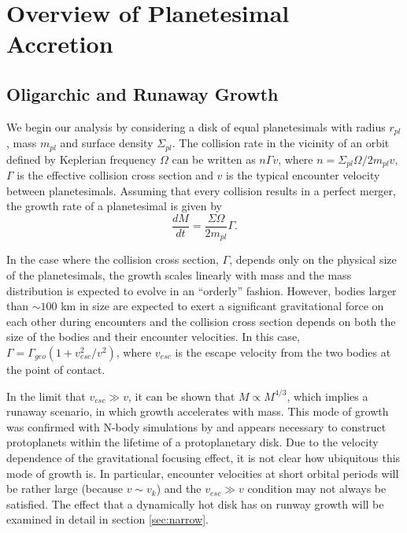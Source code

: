 \documentclass[twocolumn]{aastex63}
\begin{document}
\section{Overview of Planetesimal Accretion}\label{sec:theory}

\subsection{Oligarchic and Runaway Growth}

We begin our analysis by considering a disk of equal planetesimals
with radius $r_{pl}$, mass $m_{pl}$ and surface density
$\Sigma_{pl}$. The collision rate in the vicinity of an orbit defined
by Keplerian frequency $\Omega$ can be written as $n \Gamma v$, where
$n = \Sigma_{pl} \Omega / 2 m_{pl} v$, $\Gamma$ is the effective
collision cross section and $v$ is the typical encounter velocity
between planetesimals.
Assuming that every collision results in a perfect merger, the growth rate of a planetesimal is given by
\begin{equation}\label{eq:growth}
	\frac{dM}{dt} = \frac{\Sigma \Omega}{2 m_{pl}} \Gamma.
\end{equation}

In the case where the collision cross section, $\Gamma$, depends only
on the physical size of the planetesimals, the growth scales linearly
with mass and the mass distribution is expected to evolve in an
``orderly'' fashion. However, bodies larger than $\sim 100$ km in size are expected to exert a significant gravitational force on each other during encounters and the collision cross section depends on both the size of the bodies and their encounter velocities. In this case, $\Gamma = \Gamma_{geo} \left( 1 + v_{esc}^2 / v^2 \right)$, where $v_{esc}$ is the escape velocity from the two bodies at the point of contact.

In the limit that $v_{esc} \gg v$, it can be shown that $M \propto
M^{4/3}$, which implies a runaway scenario, in which growth
accelerates with mass. This mode of growth was confirmed with N-body
simulations by \citet{kokubo96} and appears necessary to construct
protoplanets within the lifetime of a protoplanetary disk. Due to the
velocity dependence of the gravitational focusing effect, it is not clear how ubiquitous this mode of growth is. In particular, encounter velocities at short orbital periods will be rather large (because $v \sim v_{k}$) and the $v_{esc} \gg v$ condition may not always be satisfied. The effect that a dynamically hot disk has on runway growth will be examined in detail in section \ref{sec:narrow}.
\end{document}
